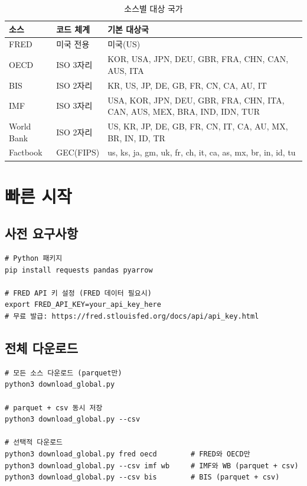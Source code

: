 \documentclass[11pt,a4paper]{article}
\begin{document}
\begin{table}[h]
\centering
\caption{소스별 대상 국가}
\begin{tabularx}{\textwidth}{l l X}
\toprule
\textbf{소스} & \textbf{코드 체계} & \textbf{기본 대상국} \\
\midrule
FRED     & 미국 전용   & 미국(US) \\
OECD     & ISO 3자리   & KOR, USA, JPN, DEU, GBR, FRA, CHN, CAN, AUS, ITA \\
BIS      & ISO 2자리   & KR, US, JP, DE, GB, FR, CN, CA, AU, IT \\
IMF      & ISO 3자리   & USA, KOR, JPN, DEU, GBR, FRA, CHN, ITA, CAN, AUS, MEX, BRA, IND, IDN, TUR \\
World Bank & ISO 2자리 & US, KR, JP, DE, GB, FR, CN, IT, CA, AU, MX, BR, IN, ID, TR \\
Factbook & GEC(FIPS)   & us, ks, ja, gm, uk, fr, ch, it, ca, as, mx, br, in, id, tu \\
\bottomrule
\end{tabularx}
\end{table}


\section{빠른 시작}

\subsection{사전 요구사항}

\begin{lstlisting}[style=bash]
# Python 패키지
pip install requests pandas pyarrow

# FRED API 키 설정 (FRED 데이터 필요시)
export FRED_API_KEY=your_api_key_here
# 무료 발급: https://fred.stlouisfed.org/docs/api/api_key.html
\end{lstlisting}

\subsection{전체 다운로드}

\begin{lstlisting}[style=bash]
# 모든 소스 다운로드 (parquet만)
python3 download_global.py

# parquet + csv 동시 저장
python3 download_global.py --csv

# 선택적 다운로드
python3 download_global.py fred oecd        # FRED와 OECD만
python3 download_global.py --csv imf wb     # IMF와 WB (parquet + csv)
python3 download_global.py --csv bis        # BIS (parquet + csv)
\end{lstlisting}
\end{document}
